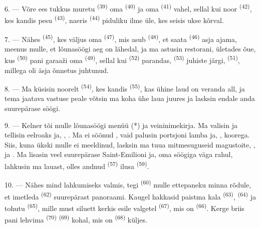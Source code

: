 6. --- Võre ees tukkus muretu  \textsuperscript{(39)} oma
 \textsuperscript{(40)} ja oma 
\textsuperscript{(41)} vahel, sellal kui noor  \textsuperscript{(42)},
kes kandis pesu \textsuperscript{(43)}, naeris 
\textsuperscript{(44)} piduliku ilme üle, kes seisis ukse kõrval.

7. --- Nähes  \textsuperscript{(45)}, kes väljus oma 
\textsuperscript{(47)}, mis asub  \textsuperscript{(48)}, et saata
 \textsuperscript{(46)} asja ajama, meenus mulle, et lõunasöögi aeg on
lähedal, ja ma astusin restorani, ületades õue, kus 
\textsuperscript{(50)} pani garaaži oma  \textsuperscript{(49)}, sellal kui
 \textsuperscript{(52)} parandas, 
\textsuperscript{(53)} juhiste järgi, 
\textsuperscript{(51)}, millega oli äsja õnnetus juhtunud.

8. --- Ma küsisin noorelt  \textsuperscript{(54)}, kes kandis
 \textsuperscript{(55)}, kas ühine laud on veranda all, ja tema jaatava
vastuse peale võtsin ma koha ühe laua juures ja lasksin endale anda suurepärase söögi.


\VUsaut{4.0mm}
\VUsaut{3.0mm}

9. --- Kelner tõi mulle lõunasöögi menüü (*) ja veininimekirja. Ma valisin ja tellisin
eelroaks   ja, , . Ma ei söönud , vaid palusin portsjoni lamba ja,
,  koorega. Siis, kuna ükski 
mulle ei meeldinud, lasksin ma tuua mitmesuguseid magustoite, ,
 ja . Ma lisasin veel suurepärase Saint-Emilioni
 ja, oma söögiga väga rahul, lahkusin ma lauast, olles andnud
 \textsuperscript{(57)} ilusa  \textsuperscript{(59)}.

10. --- Nähes mind lahkumiseks valmis, tegi  \textsuperscript{(60)}
mulle ettepaneku minna rõdule, et imetleda  \textsuperscript{(62)}
suurepärast panoraami. Kaugel hakkasid paistma kala
\textsuperscript{(63)},  \textsuperscript{(64)} ja tohutu
 \textsuperscript{(65)}, mille must siluett kerkis esile valgetel
 \textsuperscript{(67)}, mis on 
\textsuperscript{(66)}. Kerge briis pani lehvima  \textsuperscript{(70)}
 \textsuperscript{(69)} kohal, mis on  \textsuperscript{(68)}
küljes.


